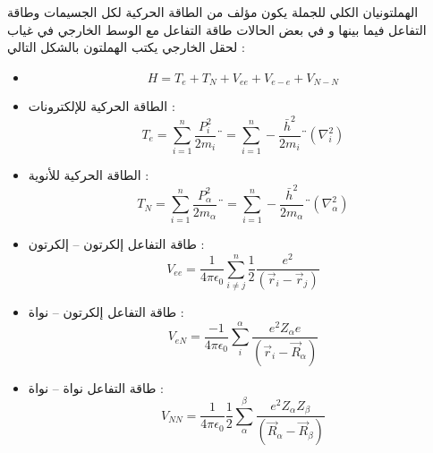 الهملتونيان الكلي للجملة يكون مؤلف من الطاقة الحركية لكل الجسيمات وطاقة التفاعل فيما بينها و في بعض الحالات طاقة التفاعل مع الوسط الخارجي في غياب لحقل الخارجي يكتب الهملتون بالشكل التالي :
\begin{itemize}
	\item 
	\begin{equation}\label{}
		H = T_e + T_N + V_{ee} + V_{e-e} + V_{N-N}
	\end{equation}
	
	\item  
	الطاقة الحركية للإلكترونات :
	\begin{equation}\label{}
		T_{e} = \sum_{i=1}^n \frac{ P_{i} ^2 }{ 2m_{i} }¨ =  \sum_{i=1}^n -\frac{ \bar{h} ^{2}  }{ 2m_{i} }¨( \nabla_{i}^{2} )
	\end{equation}
	
	\item
	الطاقة الحركية للأنوية :
	\begin{equation}\label{}
		T_{N} = \sum_{i=1}^n \frac{ P_{\alpha} ^2 }{ 2m_{\alpha} }¨ =  \sum_{i=1}^n -\frac{ \bar{h} ^{2}  }{ 2m_{\alpha} }¨( \nabla_{\alpha}^{2} )
	\end{equation}
	
	\item
	طاقة التفاعل إلكرتون – إلكرتون :
	\begin{equation}\label{}
		V_{ee} = \dfrac{1}{4\pi \epsilon_{0} } \sum_{i‫≠‬j}^n \frac{1}{2} \dfrac{e^{2}}{(\vec{r}_{i} - \vec{r}_{j})}
	\end{equation}
	
	\item
	طاقة التفاعل إلكرتون – نواة :
	\begin{equation}\label{}
		V_{eN} = \dfrac{-1}{4\pi \epsilon_{0} } \sum_{i}^\alpha  \dfrac{e^{2}Z_{\alpha} e}{(\vec{r}_{i} - \vec{R}_{\alpha})}
	\end{equation}
	
	\item
	طاقة التفاعل نواة – نواة :
	\begin{equation}\label{}
		V_{NN} = \dfrac{1}{4\pi \epsilon_{0} } \dfrac{1}{2} \sum_{\alpha}^\beta  \dfrac{e^{2}Z_{\alpha} Z_{\beta} }{(\vec{R}_{\alpha} - \vec{R}_{\beta})}
	\end{equation}
	
\end{itemize}

